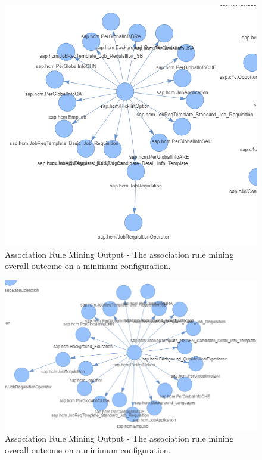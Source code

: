 \documentclass{article}
\begin{document}
\begin{figure}[ht!]
    \centering
    \includegraphics[scale=0.5]{ar-max-output}
    \caption{Association Rule Mining Output - 
The association rule mining overall outcome on a minimum configuration.}
    \label{fig:ea-max-ar}
\end{figure}

\begin{figure}[ht!]
    \centering
    \includegraphics[scale=0.5]{ar-min-output}
    \caption{Association Rule Mining Output - 
The association rule mining overall outcome on a minimum configuration.}
    \label{fig:ea-ar}
\end{figure}
\end{document}
